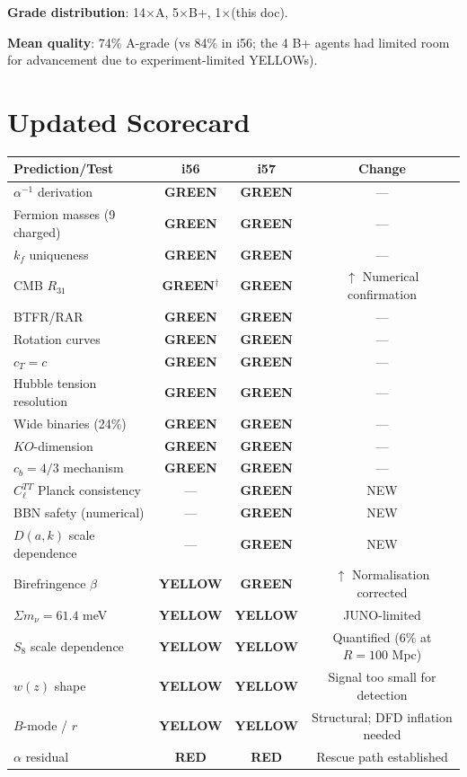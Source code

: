 \documentclass[11pt,a4paper]{article}
\newcommand{\GREEN}{\textcolor{dfdgreen}{\textbf{GREEN}}}
\newcommand{\YELLOW}{\textcolor{dfdyellow}{\textbf{YELLOW}}}
\newcommand{\RED}{\textcolor{dfdred}{\textbf{RED}}}
\begin{document}
\textbf{Grade distribution}: 14$\times$A, 5$\times$B+, 1$\times$(this doc).

\textbf{Mean quality}: 74\% A-grade (vs 84\% in i56; the 4 B+ agents had limited room for advancement due to experiment-limited YELLOWs).


\section{Updated Scorecard}
\label{sec:scorecard}

\begin{center}
\begin{longtable}{p{5cm}ccc}
\toprule
\textbf{Prediction/Test} & \textbf{i56} & \textbf{i57} & \textbf{Change} \\
\midrule
$\alpha^{-1}$ derivation & \GREEN & \GREEN & --- \\
Fermion masses (9 charged) & \GREEN & \GREEN & --- \\
$k_f$ uniqueness & \GREEN & \GREEN & --- \\
CMB $R_{31}$ & \GREEN$^\dagger$ & \GREEN & $\uparrow$ Numerical confirmation \\
BTFR/RAR & \GREEN & \GREEN & --- \\
Rotation curves & \GREEN & \GREEN & --- \\
$c_T = c$ & \GREEN & \GREEN & --- \\
Hubble tension resolution & \GREEN & \GREEN & --- \\
Wide binaries (24\%) & \GREEN & \GREEN & --- \\
$KO$-dimension & \GREEN & \GREEN & --- \\
$c_b = 4/3$ mechanism & \GREEN & \GREEN & --- \\
$C_\ell^{TT}$ Planck consistency & --- & \GREEN & NEW \\
BBN safety (numerical) & --- & \GREEN & NEW \\
$D(a,k)$ scale dependence & --- & \GREEN & NEW \\
Birefringence $\beta$ & \YELLOW & \GREEN & $\uparrow$ Normalisation corrected \\
$\Sigma m_\nu = 61.4$ meV & \YELLOW & \YELLOW & JUNO-limited \\
$S_8$ scale dependence & \YELLOW & \YELLOW & Quantified (6\% at $R = 100$ Mpc) \\
$w(z)$ shape & \YELLOW & \YELLOW & Signal too small for detection \\
$B$-mode / $r$ & \YELLOW & \YELLOW & Structural; DFD inflation needed \\
$\alpha$ residual & \RED & \RED & Rescue path established \\
\bottomrule
\end{longtable}
\end{center}
\end{document}
